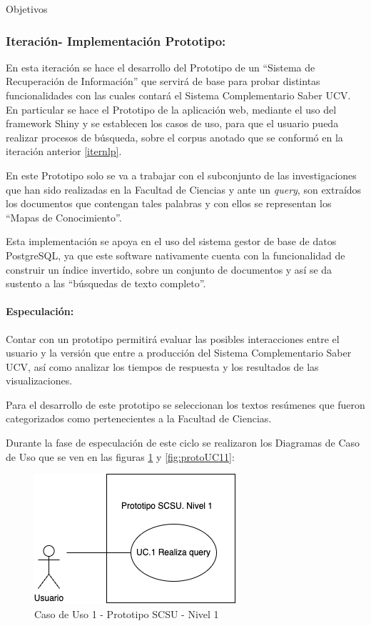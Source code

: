\documentclass[
  12pt,
  openany]{book}
\begin{document}
Objetivos

\hypertarget{iterbol}{%
\subsubsection{Iteración- Implementación Prototipo:}\label{iterbol}}

En esta iteración se hace el desarrollo del Prototipo de un ``Sistema de Recuperación de Información'' que servirá de base para probar distintas funcionalidades con las cuales contará el Sistema Complementario Saber UCV. En particular se hace el Prototipo de la aplicación web, mediante el uso del framework Shiny y se establecen los casos de uso, para que el usuario pueda realizar procesos de búsqueda, sobre el corpus anotado que se conformó en la iteración anterior \ref{iternlp}.

En este Prototipo solo se va a trabajar con el subconjunto de las investigaciones que han sido realizadas en la Facultad de Ciencias y ante un \emph{query}, son extraídos los documentos que contengan tales palabras y con ellos se representan los ``Mapas de Conocimiento''.

Esta implementación se apoya en el uso del sistema gestor de base de datos PostgreSQL, ya que este software nativamente cuenta con la funcionalidad de construir un índice invertido, sobre un conjunto de documentos y así se da sustento a las ``búsquedas de texto completo''.

\hypertarget{especulaciuxf3n-6}{%
\paragraph{Especulación:}\label{especulaciuxf3n-6}}

Contar con un prototipo permitirá evaluar las posibles interacciones entre el usuario y la versión que entre a producción del Sistema Complementario Saber UCV, así como analizar los tiempos de respuesta y los resultados de las visualizaciones.

Para el desarrollo de este prototipo se seleccionan los textos resúmenes que fueron categorizados como pertenecientes a la Facultad de Ciencias.

Durante la fase de especulación de este ciclo se realizaron los Diagramas de Caso de Uso que se ven en las figuras \ref{fig:protoUC1} y \ref{fig:protoUC11}:

\newpage

\begin{figure}

{\centering \includegraphics[width=0.45\linewidth]{images/05-desarrollo/2_ciclo/UC/prototipo_nivel1} 

}

\caption{Caso de Uso 1 - Prototipo SCSU - Nivel 1}\label{fig:protoUC1}
\end{figure}
\end{document}

